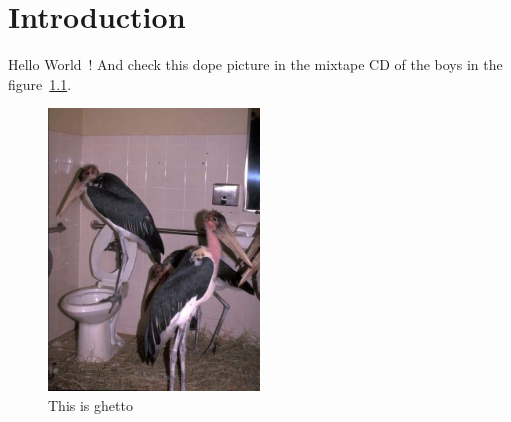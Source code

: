 \chapter{Introduction}

Hello World~\cite{einstein}!
And check this dope picture in the mixtape CD of the boys in the figure~\ref{p:guetto}.

\begin{figure}[!ht]
  \centering
  \includegraphics[width=0.5\textwidth]{assets/frontpic.jpg}
  \caption{This is ghetto}
  \label{p:guetto}
\end{figure}

